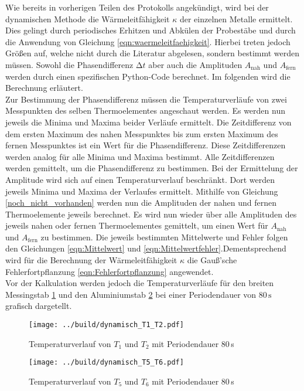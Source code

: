 Wie bereits in vorherigen Teilen des Protokolls angekündigt, wird bei der dynamischen Methode die Wärmeleitfähigkeit $\kappa$ der einzelnen Metalle
ermittelt. Dies gelingt durch periodisches Erhitzen und Abkülen der Probestäbe und durch die Anwendung von Gleichung \eqref{eqn:waermeleitfaehigkeit}.
Hierbei treten jedoch Größen auf, welche nicht durch die Literatur abgelesen, sondern bestimmt werden müssen. 
Sowohl die Phasendifferenz $\increment t$ aber auch die Amplituden $A_{\text{nah}}$ und $A_{\text{fern}}$ werden durch einen spezifischen Python-Code 
berechnet. Im folgenden wird die Berechnung erläutert. \\
Zur Bestimmung der Phasendifferenz müssen die Temperaturverläufe von zwei Messpunkten des selben Thermoelementes angeschaut werden. Es werden nun 
jeweils die Minima und Maxima beider Verläufe ermittelt. Die Zeitdifferenz von dem ersten Maximum des nahen Messpunktes bis zum ersten Maximum des fernen 
Messpunktes ist ein Wert für die Phasendifferenz. Diese Zeitdifferenzen werden analog für alle Minima und Maxima bestimmt. Alle Zeitdifferenzen werden 
gemittelt, um die Phasendifferenz zu bestimmen.
Bei der Ermittelung der Amplitude wird sich auf einen Temperaturverlauf beschränkt. Dort werden jeweils Minima und Maxima der Verlaufes ermittelt.
Mithilfe von Gleichung \eqref{noch_nicht_vorhanden} werden nun die Amplituden der nahen und fernen Thermoelemente jeweils berechnet. Es wird nun wieder 
über alle Amplituden des jeweils nahen oder fernen Thermoelementes gemittelt, um einen Wert für $A_{\text{nah}}$ und $A_{\text{fern}}$ zu bestimmen.
Die jeweils bestimmten Mittelwerte und Fehler folgen den Gleichungen \eqref{eqn:Mittelwert} und \eqref{eqn:Mittelwertfehler}.Dementsprechend wird 
für die Berechnung der Wärmeleitfähigkeit $\kappa$ die Gauß'sche Fehlerfortpflanzung \eqref{eqn:Fehlerfortpflanzung} angewendet.\\
Vor der Kalkulation werden jedoch die Temperaturverläufe für den breiten Messingstab \ref{fig:dynamisch1} und den 
Aluminiumstab \ref{fig:dynamisch2} bei einer Periodendauer von 80\,$\unit{\second}$ grafisch dargetellt.

\begin{figure}[H]
  \centering
  \texttt{[image: ../build/dynamisch\_T1\_T2.pdf]}
  \caption{Temperaturverlauf von $T_1$ und $T_2$ mit Periodendauer 80\,\unit{\second}}
  \label{fig:dynamisch1}
\end{figure}

\begin{figure}[H]
  \centering
  \texttt{[image: ../build/dynamisch\_T5\_T6.pdf]}
  \caption{Temperaturverlauf von $T_5$ und $T_6$ mit Periodendauer 80\,\unit{\second}}
  \label{fig:dynamisch2}
\end{figure}

